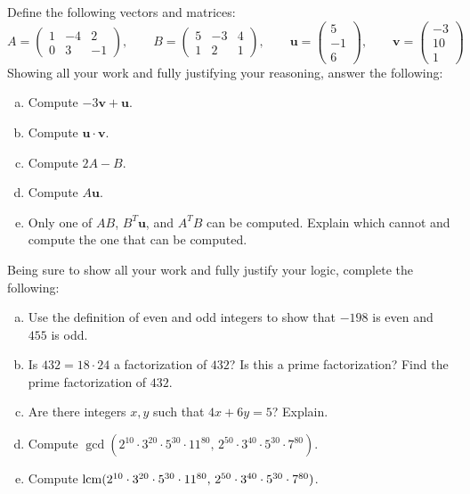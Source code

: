 \documentclass[12pt,letterpaper]{exam}
\begin{document}
\begin{questions}
\newpage
\question[10] Define the following vectors and matrices:
	\[
	A= \begin{pmatrix} 1 & -4 & 2 \\ 0 & 3 & -1 \end{pmatrix}, \qquad
	B= \begin{pmatrix} 5 & -3 & 4 \\ 1 & 2 & 1 \end{pmatrix}, \qquad
	\mathbf{u}= \begin{pmatrix} 5 \\ -1 \\ 6 \end{pmatrix}, \qquad
	\mathbf{v}= \begin{pmatrix} -3 \\ 10 \\ 1 \end{pmatrix}
	\]
Showing all your work and fully justifying your reasoning, answer the following:
	\begin{enumerate}[(a)]
	\item Compute $-3\mathbf{v} + \mathbf{u}$.
	\item Compute $\mathbf{u} \cdot \mathbf{v}$.
	\item Compute $2A - B$.
	\item Compute $A\mathbf{u}$.
	\item Only one of $AB$, $B^T\mathbf{u}$, and $A^T B$ can be computed. Explain which cannot and compute the one that can be computed. 
	\end{enumerate}



\newpage
\question[10] Being sure to show all your work and fully justify your logic, complete the following:
	\begin{enumerate}[(a)]
	\item Use the definition of even and odd integers to show that $-198$ is even and $455$ is odd. 
	\item Is $432= 18 \cdot 24$ a factorization of $432$? Is this a prime factorization? Find the prime factorization of $432$. 
	\item Are there integers $x, y$ such that $4x + 6y= 5$? Explain. 
	\item Compute $\gcd(2^{10} \cdot 3^{20} \cdot 5^{30} \cdot 11^{80}, \, 2^{50} \cdot 3^{40} \cdot 5^{30} \cdot 7^{80})$. 
	\item Compute $\operatorname{lcm}(2^{10} \cdot 3^{20} \cdot 5^{30} \cdot 11^{80}, \, 2^{50} \cdot 3^{40} \cdot 5^{30} \cdot 7^{80})$. 
	\end{enumerate}




\end{questions}
\end{document}
